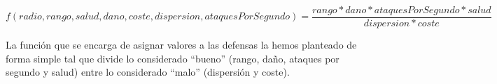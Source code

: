 $$ f(radio,rango,salud,dano,coste,dispersion,ataquesPorSegundo)=\frac{rango*dano*ataquesPorSegundo*salud}{dispersion*coste} $$

La función que se encarga de asignar valores a las defensas la hemos planteado de forma simple tal que divide lo considerado ``bueno'' (rango, daño, ataques por segundo y salud) entre lo considerado ``malo'' (dispersión y coste).